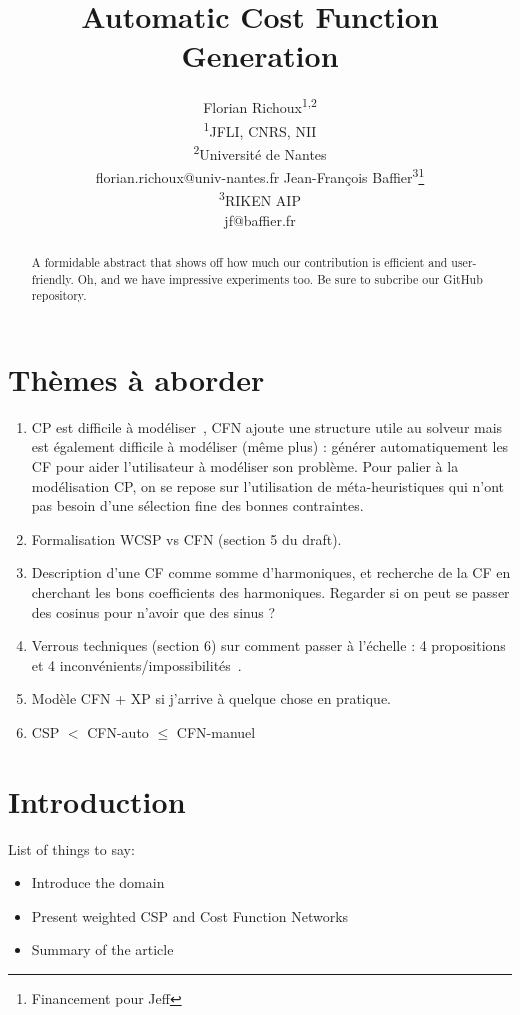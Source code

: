 \documentclass[letterpaper]{article} %
\title{Automatic Cost Function Generation}
\author{Florian Richoux\textsuperscript{\rm 1,2}\\
  \textsuperscript{\rm 1}JFLI, CNRS, NII\\
  \textsuperscript{\rm 2}Université de Nantes\\
florian.richoux@univ-nantes.fr %
\And Jean-Fran\c{c}ois Baffier\textsuperscript{\rm 3}\thanks{Financement pour Jeff}\\
\textsuperscript{\rm 3}RIKEN AIP\\
jf@baffier.fr %
}
\begin{document}
\maketitle

\begin{abstract}
A formidable abstract that shows off how much our contribution is efficient and user-friendly. Oh, and we have impressive experiments too. Be sure to subcribe our GitHub repository.
\end{abstract}

\section{Thèmes à aborder}

\begin{enumerate}
\item CP est difficile à modéliser~\cite{Puget2004,Wallace2003}, CFN ajoute une structure utile au
  solveur  mais est  également  difficile à  modéliser  (même plus)  :
  générer  automatiquement   les  CF  pour  aider   l'utilisateur  à
  modéliser  son problème.  Pour palier  à la  modélisation CP,  on se
  repose sur  l'utilisation de méta-heuristiques qui  n'ont pas besoin
  d'une sélection fine des bonnes contraintes. \cite{AMJFH2011,Bessiere2015,CBLS}
\item     Formalisation    WCSP     vs    CFN     (section    5     du
  draft). \cite{Bessiere2011,LK2014}
\item Description d'une CF comme  somme d'harmoniques, et recherche de
  la CF en  cherchant les bons coefficients  des harmoniques. Regarder
  si on peut se passer des cosinus pour n'avoir que des sinus ?
\item Verrous techniques (section 6)  sur comment passer à l'échelle :
  4 propositions et 4 inconvénients/impossibilités~\cite{PR2005}.
\item Modèle CFN + XP si j'arrive à quelque chose en pratique. \cite{Hoos2005}
\item CSP $<$ CFN-auto $\leq$ CFN-manuel
\end{enumerate}

\section{Introduction}\label{sec:introduction}
List of things to say:
\begin{itemize}
  \item Introduce the domain
  \item Present weighted CSP and Cost Function Networks
  \item Summary of the article
\end{itemize}
\end{document}
